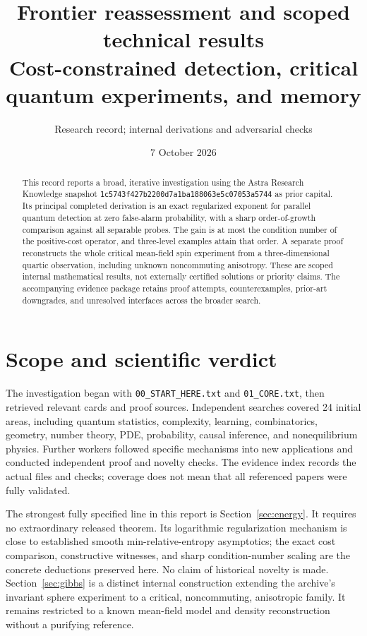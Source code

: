 \documentclass[11pt]{article}
\title{Frontier reassessment and scoped technical results\\\large Cost-constrained detection, critical quantum experiments, and memory}
\author{Research record; internal derivations and adversarial checks}
\date{7 October 2026}
\begin{document}
\maketitle
\begin{abstract}
This record reports a broad, iterative investigation using the Astra Research Knowledge snapshot
\texttt{1c5743f427b2200d7a1ba188063e5c07053a5744} as prior capital. Its principal completed derivation is an exact regularized exponent for parallel quantum detection at zero false-alarm probability, with a sharp order-of-growth comparison against all separable probes. The gain is at most the condition number of the positive-cost operator, and three-level examples attain that order. A separate proof reconstructs the whole critical mean-field spin experiment from a three-dimensional quartic observation, including unknown noncommuting anisotropy. These are scoped internal mathematical results, not externally certified solutions or priority claims. The accompanying evidence package retains proof attempts, counterexamples, prior-art downgrades, and unresolved interfaces across the broader search.
\end{abstract}
\tableofcontents

\section{Scope and scientific verdict}
The investigation began with \texttt{00\_START\_HERE.txt} and \texttt{01\_CORE.txt}, then retrieved relevant cards and proof sources. Independent searches covered 24 initial areas, including quantum statistics, complexity, learning, combinatorics, geometry, number theory, PDE, probability, causal inference, and nonequilibrium physics. Further workers followed specific mechanisms into new applications and conducted independent proof and novelty checks. The evidence index records the actual files and checks; coverage does not mean that all referenced papers were fully validated.

The strongest fully specified line in this report is Section~\ref{sec:energy}. It requires no extraordinary released theorem. Its logarithmic regularization mechanism is close to established smooth min-relative-entropy asymptotics; the exact cost comparison, constructive witnesses, and sharp condition-number scaling are the concrete deductions preserved here. No claim of historical novelty is made. Section~\ref{sec:gibbs} is a distinct internal construction extending the archive's invariant sphere experiment to a critical, noncommuting, anisotropic family. It remains restricted to a known mean-field model and density reconstruction without a purifying reference.
\end{document}
